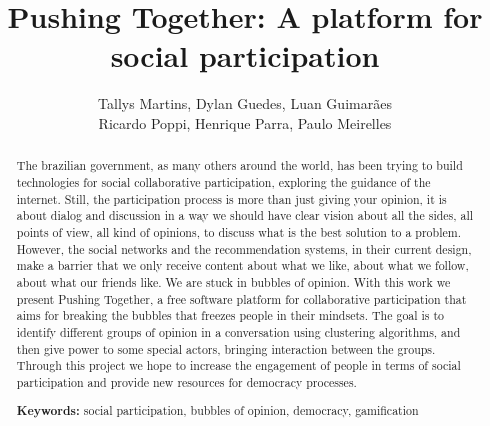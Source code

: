 \documentclass{llncs}
\begin{document}
\sloppy
\title{Pushing Together: A platform for social participation}

\author{Tallys Martins, Dylan Guedes, Luan Guimarães\\
        Ricardo Poppi, Henrique Parra, Paulo Meirelles}

  

\maketitle
\begin{abstract}
  The brazilian government, as many others around the world, has been trying to
  build technologies for social collaborative participation, exploring
  the guidance of the internet.
  Still, the participation process is more than just giving your opinion, it is
  about dialog and discussion in a way we should have clear vision about all the sides,
  all points of view, all kind of opinions, to discuss what is the best solution
  to a problem. However, the social networks and the recommendation systems, in their
  current design, make a barrier that we only receive content about
  what we like, about what we follow, about what our friends like. We are 
  stuck in bubbles of opinion.
  With this work we present Pushing Together, a free software platform
  for collaborative participation that aims for breaking the bubbles that
  freezes people in their mindsets. The goal is to identify different groups of
  opinion in a conversation using clustering algorithms, and then give power to some
  special actors, bringing interaction between the groups.
  Through this project we hope to increase the engagement of people in terms of
  social participation and provide new resources for democracy processes.

\textbf{Keywords:} social participation, bubbles of opinion, democracy, gamification
\end{abstract}
\end{document}
